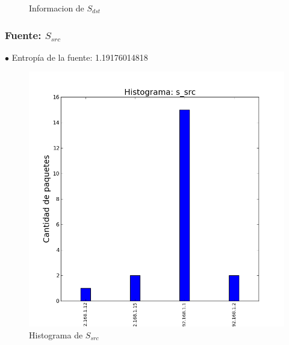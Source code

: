 \documentclass[10pt, a4paper]{article}
\begin{document}
\begin{figure}[H]
\begin{minipage}{0.5\linewidth}
    \caption{Informacion de $S_{dst}$}\label{fig:Fede-dst-info}
  \end{minipage}
\end{figure}

\subsubsection{Fuente: $S_{src}$}

$\bullet$ Entropía de la fuente: 1.19176014818

\begin{figure}[H]
  \begin{minipage}{0.5\linewidth}
    \includegraphics[width=\linewidth]{../imgs/pruebaFede-ips_s_src_hist.png}
    \caption{Histograma de $S_{src}$}\label{fig:Fede-src-hist}
  \end{minipage}
\hfill
  \begin{minipage}{0.5\linewidth}

\end{minipage}
\end{figure}
\end{document}
